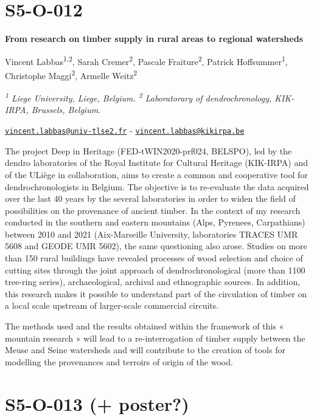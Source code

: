 \documentclass[
]{book}
\begin{document}
\hypertarget{s5-o-012}{%
\section*{S5-O-012}\label{s5-o-012}}

\textbf{From research on timber supply in rural areas to regional watersheds}

Vincent Labbas\textsuperscript{1,2}, Sarah Cremer\textsuperscript{2}, Pascale Fraiture\textsuperscript{2}, Patrick Hoffsummer\textsuperscript{1}, Christophe Maggi\textsuperscript{2}, Armelle Weitz\textsuperscript{2}

\emph{\textsuperscript{1} Liege University, Liege, Belgium. \textsuperscript{2} Laboratorary of dendrochronology, KIK-IRPA, Brussels, Belgium.}

\href{mailto:vincent.labbas@univ-tlse2.fr}{\nolinkurl{vincent.labbas@univ-tlse2.fr}} - \href{mailto:vincent.labbas@kikirpa.be}{\nolinkurl{vincent.labbas@kikirpa.be}}

The project Deep in Heritage (FED-tWIN2020-prf024, BELSPO), led by the dendro laboratories of the Royal Institute for Cultural Heritage (KIK-IRPA) and of the ULiège in collaboration, aims to create a common and cooperative tool for dendrochronologists in Belgium. The objective is to re-evaluate the data acquired over the last 40 years by the several laboratories in order to widen the field of possibilities on the provenance of ancient timber. In the context of my research conducted in the southern and eastern mountains (Alps, Pyrenees, Carpathians) between 2010 and 2021 (Aix-Marseille University, laboratories TRACES UMR 5608 and GEODE UMR 5602), the same questioning also arose. Studies on more than 150 rural buildings have revealed processes of wood selection and choice of cutting sites through the joint approach of dendrochronological (more than 1100 tree-ring series), archaeological, archival and ethnographic sources. In addition, this research makes it possible to understand part of the circulation of timber on a local scale upstream of larger-scale commercial circuits.

The methods used and the results obtained within the framework of this « mountain research » will lead to a re-interrogation of timber supply between the Meuse and Seine watersheds and will contribute to the creation of tools for modelling the provenances and terroirs of origin of the wood.

\hypertarget{s5-o-013-poster}{%
\section*{S5-O-013 (+ poster?)}\label{s5-o-013-poster}}
\end{document}
